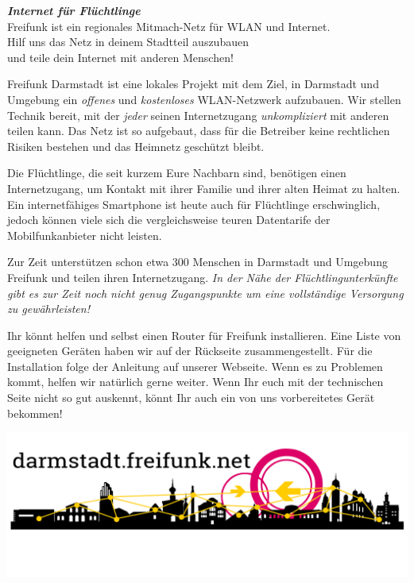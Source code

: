 \documentclass[a4paper]{article}
\begin{document}
\thispagestyle{empty}

\begin{center}
\Huge \textit{\textbf{\textcolor{freifunkpink}{Internet für Flüchtlinge}}} \\
\vspace{0.6cm}
\large Freifunk ist ein regionales Mitmach-Netz für WLAN und Internet.\\
Hilf uns das Netz in deinem Stadtteil auszubauen \\
und teile dein Internet mit anderen Menschen!
\normalsize

\vspace{1.0cm}
\end{center}

{ }
\vspace{0.5cm}

Freifunk Darmstadt ist eine lokales Projekt mit dem Ziel, in Darmstadt und Umgebung ein \emph{offenes} und \emph{kostenloses} WLAN-Netzwerk aufzubauen. Wir stellen Technik bereit, mit der \emph{jeder} seinen Internetzugang \emph{unkompliziert} mit anderen teilen kann. Das Netz ist so aufgebaut, dass für die Betreiber keine rechtlichen Risiken bestehen und das Heimnetz geschützt bleibt.

Die Flüchtlinge, die seit kurzem Eure Nachbarn sind, benötigen einen Internetzugang, um Kontakt mit ihrer Familie und ihrer alten Heimat zu halten. Ein internetfähiges Smartphone ist heute auch für Flüchtlinge erschwinglich, jedoch können viele sich die vergleichsweise teuren Datentarife der Mobilfunkanbieter nicht leisten.

Zur Zeit unterstützen schon etwa 300 Menschen in Darmstadt und Umgebung Freifunk und teilen ihren Internetzugang. \emph{In der Nähe der Flüchtlingunterkünfte gibt es zur Zeit noch nicht genug Zugangspunkte um eine vollständige Versorgung zu gewährleisten!}

Ihr könnt helfen und selbst einen Router für Freifunk installieren. Eine Liste von geeigneten Geräten haben wir auf der Rückseite zusammengestellt. Für die Installation folge der Anleitung auf unserer Webseite. Wenn es zu Problemen kommt, helfen wir natürlich gerne weiter.
Wenn Ihr euch mit der technischen Seite nicht so gut auskennt, könnt Ihr auch ein von uns vorbereitetes Gerät bekommen!

\vspace{0.6cm}

\begin{center}
\includegraphics[width=\textwidth]{../images/footer_dark}
\end{center}
\end{document}
